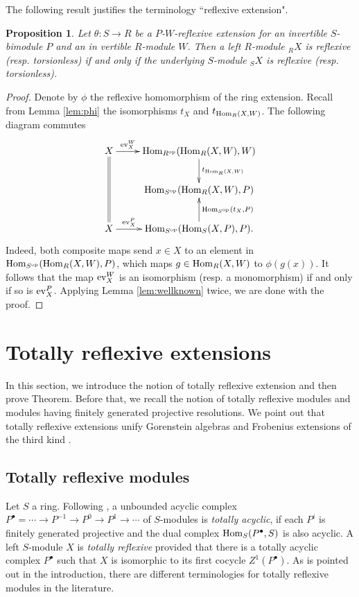 \documentclass[a4paper]{amsart}
\newtheorem{prop}[thm]{Proposition}
\theoremstyle{definition}
\theoremstyle{remark}
\numberwithin{equation}{section}
\begin{document}
The following result justifies the terminology ``reflexive extension".

\begin{prop}\label{prop:2}
Let $\theta\colon S\rightarrow R$ be a $P$-$W$-reflexive extension for  an invertible $S$-bimodule $P$ and an in vertible $R$-module $W$. Then a left $R$-module $_RX$ is reflexive (resp. torsionless) if and only if the underlying $S$-module $_SX$ is reflexive (resp. torsionless).
\end{prop}

\begin{proof} Denote by $\phi$ the reflexive homomorphism of the ring extension. Recall from Lemma \ref{lem:phi} the isomorphisms
$t_X$ and $t_{{\rm Hom}_R(X, W)}$. The following diagram commutes
\[\xymatrix{
X\ar@{=}[dd]\ar[r]^-{{\rm ev}_X^W} & {\rm Hom}_{R^{\rm op}}({\rm Hom}_R(X, W), W)\ar[d]^-{t_{{\rm Hom}_R(X, W)}}\\
                       &  {\rm Hom}_{S^{\rm op}}({\rm Hom}_R(X, W), P)\\
X \ar[r]^-{{\rm ev}_X^P}                       & {\rm Hom}_{S^{\rm op}}({\rm Hom}_S(X, P), P) \ar[u]_{{\rm Hom}_{S^{\rm op}}(t_X, P)}.
}\]
Indeed, both composite maps  send $x\in X$ to an element in ${\rm Hom}_{S^{\rm op}}({\rm Hom}_R(X, W), P)$, which maps
$g\in {\rm Hom}_R(X, W)$ to $\phi(g(x))$. It follows that the map ${\rm ev}_X^W$ is an isomorphism (resp. a monomorphism) if and only if so is ${\rm ev}_X^P$.  Applying Lemma \ref{lem:wellknown} twice, we are done with the proof.
\end{proof}

\section{Totally reflexive extensions}

In this section, we introduce the notion of totally reflexive extension and then prove Theorem. Before that, we
recall the notion of totally reflexive modules \cite{ABr, AM} and modules having finitely generated projective resolutions. We point out that totally reflexive extensions unify Gorenstein
algebras \cite{AH} and Frobenius extensions of the third kind \cite{KS}.

\subsection{Totally reflexive modules} Let $S$ a ring. Following \cite{AM}, a unbounded acyclic complex $P^\bullet=\cdots\rightarrow P^{-1}\rightarrow P^0\rightarrow P^1\rightarrow \cdots$ of $S$-modules is \emph{totally acyclic}, if each $P^i$ is finitely generated projective and the dual complex ${\rm Hom}_S(P^\bullet, S)$ is  also acyclic. A left $S$-module $X$ is \emph{totally reflexive} provided that there is a totally acyclic complex  $P^\bullet$ such that $X$ is isomorphic to its first cocycle $Z^1(P^\bullet)$. As is pointed out in the introduction, there are different terminologies for totally reflexive modules in the literature.
\end{document}
